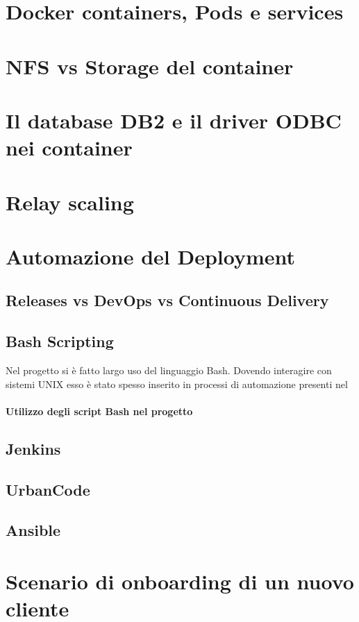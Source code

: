 \section{Docker containers, Pods e services}

\section{NFS vs Storage del container}

\section{Il database DB2 e il driver ODBC nei container}

\section{Relay scaling}

\section{Automazione del Deployment}
\subsection{Releases vs DevOps vs Continuous Delivery}
\subsection{Bash Scripting}
Nel progetto si è fatto largo uso del linguaggio Bash. Dovendo interagire con sistemi UNIX esso è stato spesso inserito in processi di automazione presenti nel 
\paragraph{Utilizzo degli script Bash nel progetto}
\subsection{Jenkins}
\subsection{UrbanCode}
\subsection{Ansible}

\section{Scenario di onboarding di un nuovo cliente}

